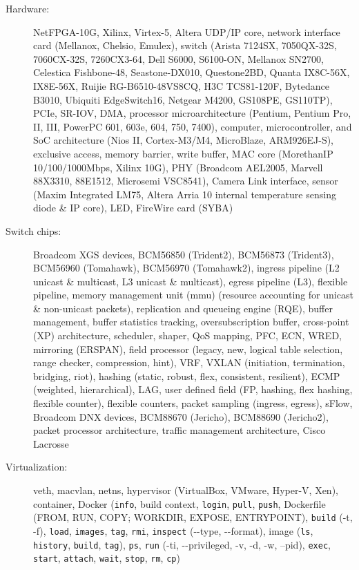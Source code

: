 \documentclass[letterpaper,11pt]{article}
\begin{document}
\begin{description}
\item[Hardware:] NetFPGA-10G, Xilinx, Virtex-5, Altera UDP/IP core, network interface card (Mellanox, Chelsio, Emulex),
switch (Arista 7124SX, 7050QX-32S, 7060CX-32S, 7260CX3-64, Dell S6000, S6100-ON, Mellanox SN2700,
Celestica Fishbone-48, Seastone-DX010, Questone2BD,
Quanta IX8C-56X, IX8E-56X, Ruijie RG-B6510-48VS8CQ, H3C TCS81-120F, Bytedance B3010,
Ubiquiti EdgeSwitch16, Netgear M4200, GS108PE, GS110TP), PCIe, SR-IOV, DMA,
processor microarchitecture (Pentium, Pentium Pro, II, III, PowerPC 601, 603e, 604, 750, 7400),
computer, microcontroller, and SoC architecture (Nios II, Cortex-M3/M4, MicroBlaze, ARM926EJ-S),
exclusive access, memory barrier, write buffer,
MAC core (MorethanIP 10/100/1000Mbps, Xilinx 10G),
PHY (Broadcom AEL2005, Marvell 88X3310, 88E1512, Microsemi VSC8541), Camera Link interface, sensor (Maxim Integrated LM75,
Altera Arria 10 internal temperature sensing diode \& IP core), LED,
FireWire card (SYBA)

\item[Switch chips:] Broadcom XGS devices, BCM56850 (Trident2), BCM56873 (Trident3), BCM56960 (Tomahawk), BCM56970 (Tomahawk2),
ingress pipeline (L2 unicast \& multicast, L3 unicast \& multicast), egress pipeline (L3),
flexible pipeline, memory management unit (mmu) (resource accounting for unicast \& non-unicast packets), replication and queueing engine (RQE),
buffer management, buffer statistics tracking, oversubscription buffer,
cross-point (XP) architecture, scheduler, shaper, QoS mapping, PFC, ECN, WRED, mirroring (ERSPAN),
field processor (legacy, new, logical table selection, range checker, compression, hint),
VRF, VXLAN (initiation, termination, bridging, riot), hashing (static, robust, flex, consistent, resilient), ECMP (weighted, hierarchical), LAG,
user defined field (FP, hashing, flex hashing, flexible counter), flexible counters,
packet sampling (ingress, egress), sFlow,
Broadcom DNX devices, BCM88670 (Jericho), BCM88690 (Jericho2), packet processor architecture, traffic management architecture,
Cisco Lacrosse

\item[Virtualization:] veth, macvlan, netns, hypervisor (VirtualBox, VMware, Hyper-V, Xen), container, Docker ({\tt info},
build context, {\tt login}, {\tt pull}, {\tt push},
Dockerfile (FROM, RUN, COPY; WORKDIR, EXPOSE, ENTRYPOINT), {\tt build} (-t, -f),
{\tt load}, {\tt images}, {\tt tag}, {\tt rmi}, {\tt inspect} (-{}-type, -{}-format),
image ({\tt ls}, {\tt history}, {\tt build}, {\tt tag}),
{\tt ps}, {\tt run} (-ti, -{}-privileged, -v, -d, -w, --pid), {\tt exec}, {\tt start}, {\tt attach}, {\tt wait}, {\tt stop}, {\tt rm},
{\tt cp})


\end{description}
\end{document}
